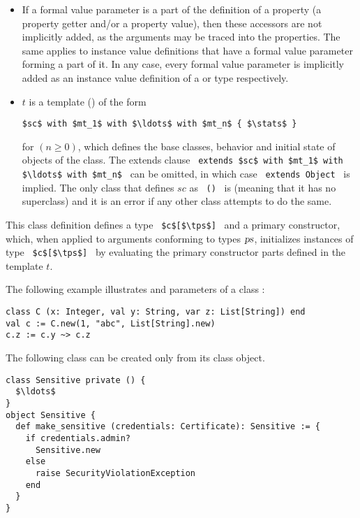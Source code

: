 \begin{itemize}
\item[]
If a formal value parameter is a part of the definition of a property (a property getter and/or a property value), then these accessors are not implicitly added, as the arguments may be traced into the properties. The same applies to instance value definitions that have a formal value parameter forming a part of it. In any case, every formal value parameter is implicitly added as an instance value definition of  a  or  type respectively. 

\item[]
$t$ is a template () of the form
\begin{lstlisting}
$sc$ with $mt_1$ with $\ldots$ with $mt_n$ { $\stats$ }
\end{lstlisting}
for $(n \geq 0)$, which defines the base classes, behavior and initial state of objects of the class. The extends clause ~\lstinline!extends $sc$ with $mt_1$ with $\ldots$ with $mt_n$!~ can be omitted, in which case ~\lstinline!extends Object!~ is implied. The only class that defines $sc$ as ~\lstinline!()!~ is  (meaning that it has no superclass) and it is an error if any other class attempts to do the same. 

\end{itemize}

This class definition defines a type ~\lstinline!$c$[$\tps$]!~ and a primary constructor, which, when applied to arguments conforming to types $\mbox{\sl ps}$, initializes instances of type ~\lstinline!$c$[$\tps$]!~ by evaluating the primary constructor parts defined in the template $t$. 

\example The following example illustrates  and  parameters of a class : 
\begin{lstlisting}
class C (x: Integer, val y: String, var z: List[String]) end
val c := C.new(1, "abc", List[String].new)
c.z := c.y ~> c.z
\end{lstlisting}

\example The following class can be created only from its class object. 
\begin{lstlisting}
class Sensitive private () {
  $\ldots$
}
object Sensitive {
  def make_sensitive (credentials: Certificate): Sensitive := {
    if credentials.admin?
      Sensitive.new
    else 
      raise SecurityViolationException
    end
  }
}
\end{lstlisting}






